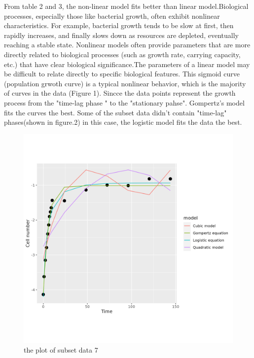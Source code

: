 \documentclass{article}
\begin{document}
From table 2 and 3, the non-linear model fits better than linear model.Biological processes, especially those like bacterial growth, often exhibit nonlinear characteristics. For example, bacterial growth tends to be slow at first, then rapidly increases, and finally slows down as resources are depleted, eventually reaching a stable state. Nonlinear models often provide parameters that are more directly related to biological processes\cite{zwietering1990} (such as growth rate, carrying capacity, etc.) that have clear biological significance.The parameters of a linear model may be difficult to relate directly to specific biological features.
This sigmoid curve (population grwoth curve) is a typical nonlinear behavior, which is the majority of curves in the data (Figure 1).  Sincce the data points represent the growth process from the "time-lag phase " to the "stationary pahse". Gompertz's model fits the curves the best. 
Some of the subset data didn't contain "time-lag" phases(shown in figure.2) in this case, the logistic model fits the data the best.
\begin{figure}
        \centering
        \includegraphics[width=0.5\linewidth]{../results/subset_ 7 _plot.png}
        \caption{the plot of subset data 7 }
        \label{fig:enter-label}
    \end{figure}
\end{document}
